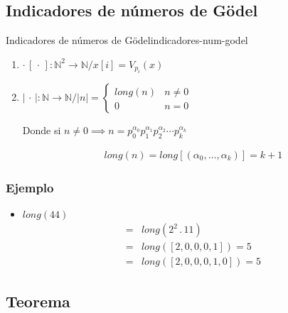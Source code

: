 \subsection{Indicadores de números de Gödel}

\begin{definicion}{Indicadores de números de Gödel}{indicadores-num-godel}
    \begin{enumerate}
        \item {}%
            $\cdot \, [ \, \cdot \, ]: \mathbb{N}^2 \to \mathbb{N} /
            x[i] = V_{p_i}(x)$
        \item $|\, \cdot \,|: \mathbb{N} \to \mathbb{N} /
            |n| = \begin{cases}
                long(n) & n \neq 0\\
                0 & n = 0
            \end{cases}$

            Donde si $n \neq 0 \implies n = p_0^{\alpha_0} p_1^{\alpha_1}
            p_2^{\alpha_2} \cdots p_k^{\alpha_k}$ 

            \begin{gather*}
                long(n) = long[(\alpha_0, \dotsc, \alpha_k)]  = k + 1
            \end{gather*}
    \end{enumerate}
\end{definicion}

\subsubsection{Ejemplo}

\begin{itemize}
    \item $long(44)$ 
        \begin{align*}
            =& long(2^2 \, . \, 11) \\
            =& long([2,0,0,0,1]) = 5 \\
            =& long([2,0,0,0,1,0]) = 5
        \end{align*}
\end{itemize}

\subsection{Teorema}

